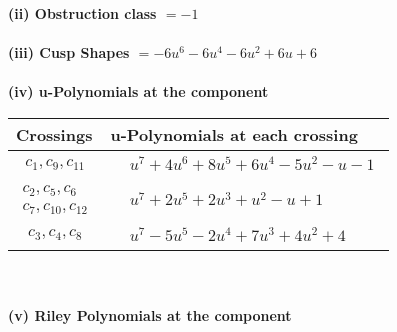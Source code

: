 \documentclass[1p]{elsarticle_modified}
\theoremstyle{definition}
\begin{document}
\flushleft \textbf{(ii) Obstruction class $= -1$}\\~\\
\flushleft \textbf{(iii) Cusp Shapes $= -6 u^6-6 u^4-6 u^2+6 u+6$}\\~\\
\newpage\renewcommand{\arraystretch}{1}
\flushleft \textbf{(iv) u-Polynomials at the component}\newline \\
\begin{tabular}{m{50pt}|m{274pt}}
Crossings & \hspace{64pt}u-Polynomials at each crossing \\
\hline $$\begin{aligned}c_{1},c_{9},c_{11}\end{aligned}$$&$\begin{aligned}
&u^7+4 u^6+8 u^5+6 u^4-5 u^2- u-1
\end{aligned}$\\
\hline $$\begin{aligned}c_{2},c_{5},c_{6}\\c_{7},c_{10},c_{12}\end{aligned}$$&$\begin{aligned}
&u^7+2 u^5+2 u^3+u^2- u+1
\end{aligned}$\\
\hline $$\begin{aligned}c_{3},c_{4},c_{8}\end{aligned}$$&$\begin{aligned}
&u^7-5 u^5-2 u^4+7 u^3+4 u^2+4
\end{aligned}$\\
\hline
\end{tabular}\\~\\
\newpage\renewcommand{\arraystretch}{1}
\flushleft \textbf{(v) Riley Polynomials at the component}\newline \\
\end{document}
